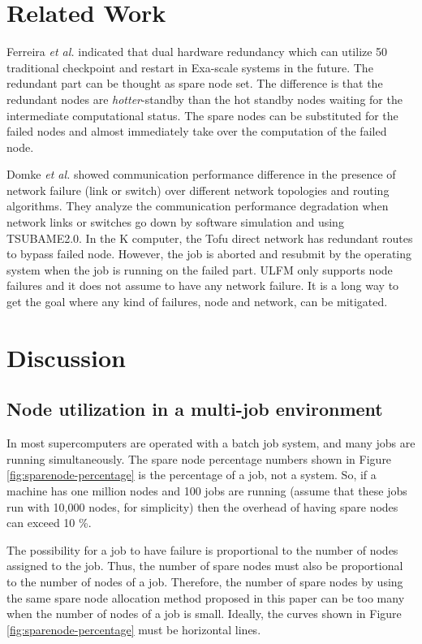 \documentclass[10pt,conference,a4paper,fleqn]{IEEEtran}
\begin{document}
\section{Related Work}\label{sec:related-work}

Ferreira {\it et al.} indicated that dual hardware redundancy which can
utilize 50%
traditional checkpoint and restart in Exa-scale
systems\cite{Ferreira:2011:EVP:2063384.2063443} in the future. The
redundant part can be thought as spare node set. The difference is
that the redundant nodes are {\it hotter}-standby than the hot standby
nodes waiting for the intermediate computational status. The spare
nodes can be substituted for the failed nodes and almost immediately
take over the computation of the failed node.

Domke {\it et al.} showed communication performance difference in the
presence of network failure (link or switch) over different network
topologies and routing
algorithms\cite{Domke:2014:FND:2683593.2683659}. They analyze the
communication performance degradation when network links or switches
go down by software simulation and using TSUBAME2.0. In the K
computer, the Tofu direct network has redundant routes to bypass
failed node. However, the job is aborted and resubmit by the operating
system when the job is running on the failed part. ULFM only
supports node failures and it does not assume to have any
network failure. It is a long way to get the goal where
any kind of failures, node and network, can be mitigated.

\section{Discussion}

\subsection{Node utilization in a multi-job environment}
\label{label:multi-job}

In most supercomputers are operated with a batch job system, and many
jobs are running simultaneously. The spare node percentage numbers
shown in Figure \ref{fig:sparenode-percentage} is the percentage of a
job, not a system. So, if a machine has one million nodes and 100 jobs
are running (assume that these jobs run with 10,000 nodes, for
simplicity) then the overhead of having spare nodes can exceed 10
\%. 

The possibility for a job to have failure is proportional to the
number of nodes assigned to the job. Thus, the number of spare nodes
must also be proportional to the number of nodes of a job. Therefore,
the number of spare nodes by using the same spare node allocation
method proposed in this paper can be too many when the number of nodes
of a job is small. Ideally, the curves shown in Figure
\ref{fig:sparenode-percentage} must be horizontal lines.
\end{document}

